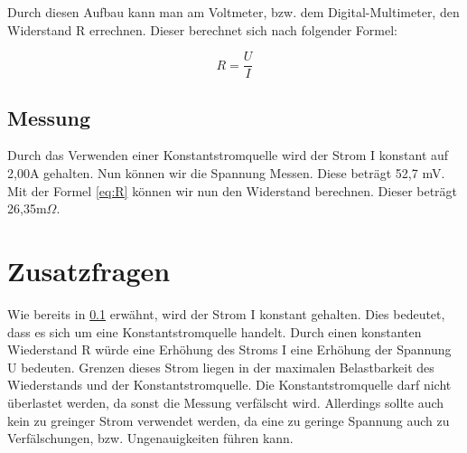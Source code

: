 Durch diesen Aufbau kann man am Voltmeter, bzw. dem Digital-Multimeter,
den Widerstand R errechnen. Dieser berechnet sich nach folgender Formel:

\begin{equation}
    R = \frac{U}{I}
    \label{eq:R}
\end{equation}

\subsection{Messung}
\label{subsec:Messung}
Durch das Verwenden einer Konstantstromquelle wird der Strom I konstant
auf 2,00A gehalten. Nun können wir die Spannung Messen. Diese beträgt
52,7 mV. Mit der Formel \ref*{eq:R} können wir nun den Widerstand
berechnen. Dieser beträgt 26,35m$\Omega$.

\section{Zusatzfragen}

Wie bereits in \ref{subsec:Messung} erwähnt, wird der Strom I konstant
gehalten. Dies bedeutet, dass es sich um eine Konstantstromquelle handelt.
Durch einen konstanten Wiederstand R würde eine Erhöhung des Stroms I
eine Erhöhung der Spannung U bedeuten. 
Grenzen dieses Strom liegen in der maximalen Belastbarkeit des Wiederstands
und der Konstantstromquelle. Die Konstantstromquelle darf nicht überlastet
werden, da sonst die Messung verfälscht wird. Allerdings sollte auch kein 
zu greinger Strom verwendet werden, da eine zu geringe Spannung auch zu
Verfälschungen, bzw. Ungenauigkeiten führen kann.

